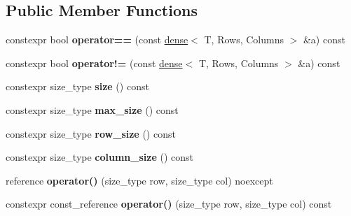 \subsection*{Public Member Functions}
\begin{DoxyCompactItemize}
\item 
\mbox{\label{classnumpp_1_1matrix_1_1dense_a47826545acba433708f30d8d46ed66fa}} 
constexpr bool {\bfseries operator==} (const \hyperlink{classnumpp_1_1matrix_1_1dense}{dense}$<$ T, Rows, Columns $>$ \&a) const
\item 
\mbox{\label{classnumpp_1_1matrix_1_1dense_ab9b6f88f2dec14a80a72e99913a3f068}} 
constexpr bool {\bfseries operator!=} (const \hyperlink{classnumpp_1_1matrix_1_1dense}{dense}$<$ T, Rows, Columns $>$ \&a) const
\item 
\mbox{\label{classnumpp_1_1matrix_1_1dense_ae10fc38c7fc7866eb9e7eced95721197}} 
constexpr size\+\_\+type {\bfseries size} () const
\item 
\mbox{\label{classnumpp_1_1matrix_1_1dense_ab5285a02970247cd61d5ec34a387b5b1}} 
constexpr size\+\_\+type {\bfseries max\+\_\+size} () const
\item 
\mbox{\label{classnumpp_1_1matrix_1_1dense_a2fccc43bbe43b24a927b6ee064b5d76f}} 
constexpr size\+\_\+type {\bfseries row\+\_\+size} () const
\item 
\mbox{\label{classnumpp_1_1matrix_1_1dense_a19093013442e9a37259a1e793a1e8f91}} 
constexpr size\+\_\+type {\bfseries column\+\_\+size} () const
\item 
\mbox{\label{classnumpp_1_1matrix_1_1dense_a87a5f2fd595bd9fa0f91dd6d823dfc0d}} 
reference {\bfseries operator()} (size\+\_\+type row, size\+\_\+type col) noexcept
\item 
\mbox{\label{classnumpp_1_1matrix_1_1dense_acb213c3d0d2c08160b473f2d08ec4da3}} 
constexpr const\+\_\+reference {\bfseries operator()} (size\+\_\+type row, size\+\_\+type col) const
\end{DoxyCompactItemize}
